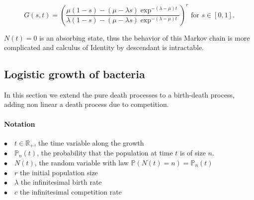 \documentclass{article}
\newcommand{\pr}{{\mathbb{P}}}
\begin{document}
\begin{equation}
\displaystyle  G(s,t)=  \left( \dfrac{\mu (1-s)-(\mu- \lambda s) \exp^{-(\lambda - \mu )t}}{\lambda (1-s)-(\mu -\lambda s) \exp^{-(\lambda -\mu )t}} \right)^{r} \text{ for } s \in [0,1].
\end{equation}

$N(t)=0$ is an absorbing state, thus the behavior of this Markov chain is more complicated and calculus of Identity by descendant is intractable. 

\subsection{Logistic growth of bacteria}

In this section we extend the pure death processes to a birth-death process, adding non linear a death process due to competition.

 \paragraph{Notation} $ $\\
 $\bullet \quad t \in \mathbb{R}_+$, the time variable along the growth\\
 $\bullet \quad \pr_n(t)$, the probability that the population at time $t$ is of size $n$.\\
 $\bullet \quad N(t)$, the random variable with law $\pr(N(t)=n)=\pr_n(t)$\\
 $\bullet \quad r$ the initial population size\\
 $\bullet \quad \lambda$ the infinitesimal birth rate\\
 $\bullet \quad c$ the infinitesimal competition rate\\ 
 
\end{document}
